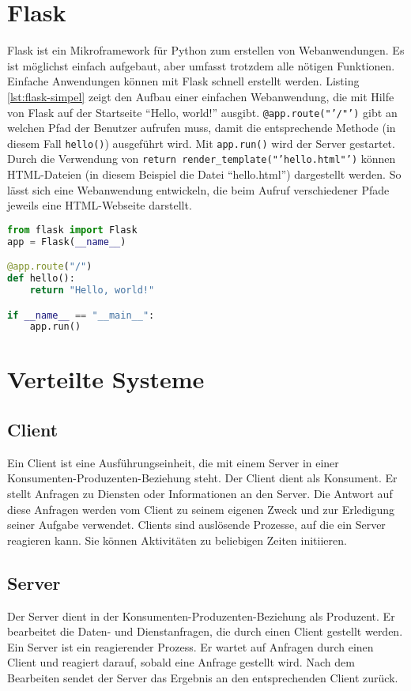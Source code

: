 \section{Flask}\label{sec:flask}
Flask ist ein Mikroframework für Python zum erstellen von Webanwendungen. Es ist
möglichst einfach aufgebaut, aber umfasst trotzdem alle nötigen Funktionen.
Einfache Anwendungen können mit Flask schnell erstellt werden. \cite{Flask2018}
Listing \ref{lst:flask-simpel} zeigt den Aufbau einer einfachen Webanwendung, die mit
Hilfe von Flask auf der Startseite "`Hello, world!"' ausgibt.
\texttt{@app.route("'/"')} gibt an welchen Pfad der Benutzer aufrufen muss,
damit die entsprechende Methode (in diesem Fall \texttt{hello()}) ausgeführt
wird. Mit \texttt{app.run()} wird der Server gestartet. Durch die Verwendung von
\texttt{return render\_template("'hello.html"')} können HTML-Dateien (in diesem
Beispiel die Datei "`hello.html"') dargestellt werden. So lässt sich eine
Webanwendung entwickeln, die beim Aufruf verschiedener Pfade jeweils eine
HTML-Webseite darstellt.

\begin{lstlisting}[float, language=Python, frame=single, framexleftmargin=15pt,
style=algoBericht, label={lst:flask-simpel}, captionpos=b, caption={Einfache
Webanwendung, die auf der Startseite "`Hello, world!"' ausgibt}]
from flask import Flask
app = Flask(__name__)

@app.route("/")
def hello():
	return "Hello, world!"

if __name__ == "__main__":
	app.run()
\end{lstlisting}

\section{Verteilte Systeme}
\subsection{Client}
Ein Client ist eine Ausführungseinheit, die mit einem Server in einer
Konsumenten-Produzenten-Beziehung steht. Der Client dient als Konsument. Er
stellt Anfragen zu Diensten oder Informationen an den Server. Die Antwort auf
diese Anfragen werden vom Client zu seinem eigenen Zweck und zur Erledigung
seiner Aufgabe verwendet. Clients sind auslösende Prozesse, auf die ein Server
reagieren kann. Sie können Aktivitäten zu beliebigen Zeiten initiieren.
\cite{Bengel2015}

\subsection{Server}
Der Server dient in der Konsumenten-Produzenten-Beziehung als Produzent. Er
bearbeitet die Daten- und Dienstanfragen, die durch einen Client gestellt
werden. Ein Server ist ein reagierender Prozess. Er wartet auf Anfragen durch
einen Client und reagiert darauf, sobald eine Anfrage gestellt wird. Nach dem
Bearbeiten sendet der Server das Ergebnis an den entsprechenden Client zurück.

